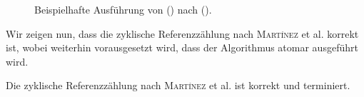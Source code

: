 \begin{figure}[h]
	\centering
	\begin{subfigure}{0.4\textwidth}
		\centering
		
	\end{subfigure}~\hspace{0.5cm}~
	\begin{subfigure}{0.4\textwidth}
		\centering
		
	\end{subfigure}\\[1cm]
	\begin{subfigure}{0.4\textwidth}
		\centering
		
	\end{subfigure}~\hspace{0.5cm}~
	\begin{subfigure}{0.4\textwidth}
		\centering
		
	\end{subfigure}\\[1cm]
	\begin{subfigure}{0.4\textwidth}
		\centering
		
	\end{subfigure}~\hspace{0.5cm}~
	\begin{subfigure}{0.4\textwidth}
		\centering
		
	\end{subfigure}
	\caption[Ausführung von ()]{Beispielhafte Ausführung von () nach ().}
	\label{fig:rc-unmark-example}
\end{figure}

Wir zeigen nun, dass die zyklische Referenzzählung nach \textsc{Martínez} et al. korrekt ist, wobei weiterhin vorausgesetzt wird, dass der Algorithmus atomar ausgeführt wird.

\begin{mybox}
\begin{satz}
\label{satz:cyclic-rc-correctness}
	Die zyklische Referenzzählung nach \textsc{Martínez} et al. ist korrekt und terminiert.
\end{satz}
\end{mybox}

